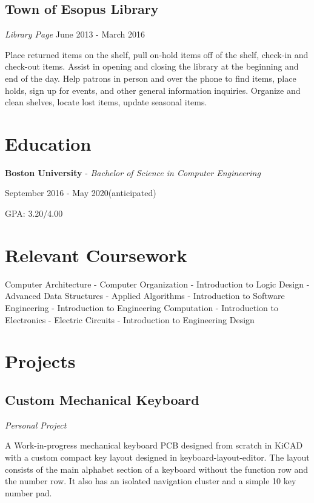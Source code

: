\documentclass{article}
\begin{document}
\subsection{Town of Esopus Library} \textit{Library Page}
June 2013 - March 2016

Place returned items on the shelf, pull on-hold items off of the shelf, check-in and check-out items. Assist in opening and closing the library at the beginning and end of the day. Help patrons in person and over the phone to find items, place holds, sign up for events, and other general information inquiries. Organize and clean shelves, locate lost items, update seasonal items.

\vspace{-.75em}
\section{Education}
\textbf{Boston University} - \textit{Bachelor of Science in Computer Engineering}

September 2016 - May 2020(anticipated)

GPA: 3.20/4.00

\vspace{-.75em}
\section{Relevant Coursework}
{\centering
Computer Architecture - Computer Organization - Introduction to Logic Design - Advanced Data Structures - Applied Algorithms - Introduction to Software Engineering - Introduction to Engineering Computation - Introduction to Electronics - Electric Circuits - Introduction to Engineering Design
\par
}

\vspace{-.75em}
\section{Projects}
\subsection{Custom Mechanical Keyboard} \textit{Personal Project}

A Work-in-progress mechanical keyboard PCB designed from scratch in KiCAD with a custom compact key layout designed in keyboard-layout-editor. The layout consists of the main alphabet section of a keyboard without the function row and the number row. It also has an isolated navigation cluster and a simple 10 key number pad.
\vspace{-.75em}
\end{document}
